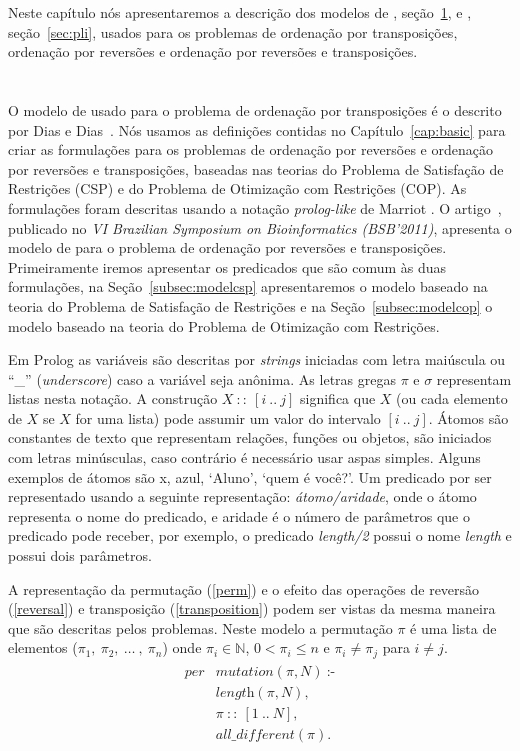 Neste capítulo nós apresentaremos a descrição dos modelos de \pr{},
seção~\ref{sec:cp}, e \pli{}, seção~\ref{sec:pli}, usados para os
problemas de ordenação por transposições, ordenação por reversões e
ordenação por reversões e transposições.

\section{\PR}
\label{sec:cp}
O modelo de \pr{} usado para o problema de ordenação por transposições é
o descrito por Dias e Dias~\cite{DiasDias*2009}. Nós usamos as
definições contidas no Capítulo~\ref{cap:basic} para criar as
formulações para os problemas de ordenação por reversões e ordenação por
reversões e transposições, baseadas nas teorias do Problema de
Satisfação de Restrições (CSP) e do Problema de Otimização com
Restrições (COP). As formulações foram descritas usando a notação
\textit{prolog-like} de Marriot \cite{Marriott*1998}. O
artigo~\cite{IizukaDias*2011}, publicado no \textit{VI Brazilian
Symposium on Bioinformatics (BSB'2011)}, apresenta o modelo de \pr{}
para o problema de ordenação por reversões e transposições.
Primeiramente iremos apresentar os predicados que são comum às duas
formulações, na Seção~\ref{subsec:modelcsp} apresentaremos o modelo
baseado na teoria do Problema de Satisfação de Restrições e na
Seção~\ref{subsec:modelcop} o modelo baseado na teoria do Problema de
Otimização com Restrições.

Em Prolog as variáveis são descritas por \textit{strings} iniciadas com
letra maiúscula ou ``\_'' (\textit{underscore}) caso a variável seja
anônima. As letras gregas $\pi$ e $\sigma$ representam listas nesta
notação. A construção $X~::~[i~..~j]$ significa que $X$ (ou cada
elemento de $X$ se $X$ for uma lista) pode assumir um valor do intervalo
$[i~..~j]$. Átomos são constantes de texto que representam relações,
funções ou objetos, são iniciados com letras minúsculas, caso contrário
é necessário usar aspas simples.  Alguns exemplos de átomos são x, azul,
`Aluno', `quem é você?'. Um predicado por ser representado usando a
seguinte representação: \textit{átomo/aridade}, onde o átomo representa
o nome do predicado, e aridade é o número de parâmetros que o predicado
pode receber, por exemplo, o predicado \textit{length/2} possui o nome
\textit{length} e possui dois parâmetros.

A representação da permutação (\ref{perm}) e o efeito das operações de
reversão (\ref{reversal}) e transposição (\ref{transposition}) podem ser
vistas da mesma maneira que são descritas pelos problemas. Neste modelo
a permutação $\pi$ é uma lista de elementos
($\pi_{1},~\pi_{2},~\ldots~,~\pi_{n}$) onde $\pi_{i} \in \mathbb{N}$, $0
< \pi_{i} \le n$ e $\pi_{i} \neq \pi_{j}$ para $i \neq j$.
\begin{align}
  \label{perm}
  \begin{split}
  \textit{per}&\textit{mutation}(\pi, N)~\text{:-} \\
  &\textit{length}(\pi, N), \\ 
  &\pi~::~[1~..~N], \\
  &\textit{all\_different}(\pi). 
  \end{split}
\end{align}

